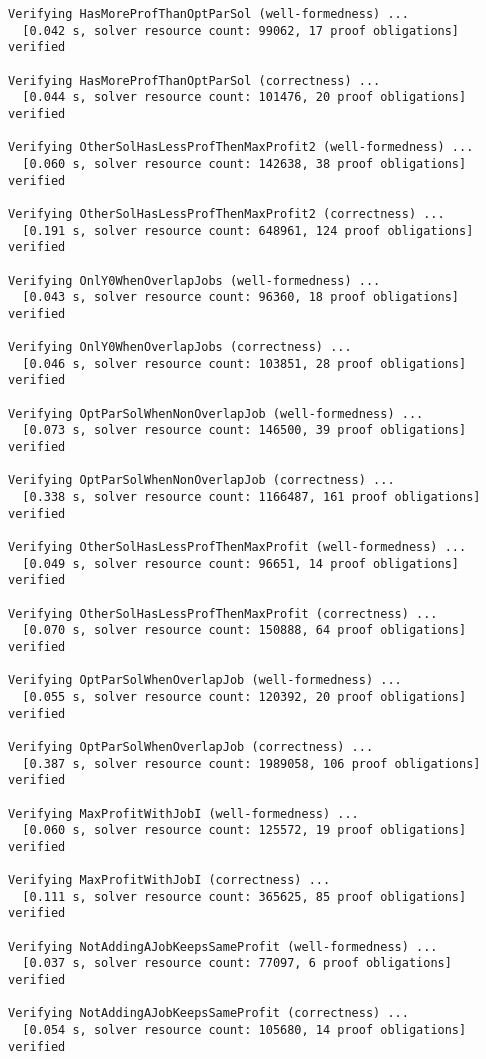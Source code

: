 \begin{Verbatim}[fontsize=\small]
Verifying HasMoreProfThanOptParSol (well-formedness) ...
  [0.042 s, solver resource count: 99062, 17 proof obligations]  verified

Verifying HasMoreProfThanOptParSol (correctness) ...
  [0.044 s, solver resource count: 101476, 20 proof obligations]  verified

Verifying OtherSolHasLessProfThenMaxProfit2 (well-formedness) ...
  [0.060 s, solver resource count: 142638, 38 proof obligations]  verified

Verifying OtherSolHasLessProfThenMaxProfit2 (correctness) ...
  [0.191 s, solver resource count: 648961, 124 proof obligations]  verified

Verifying OnlY0WhenOverlapJobs (well-formedness) ...
  [0.043 s, solver resource count: 96360, 18 proof obligations]  verified

Verifying OnlY0WhenOverlapJobs (correctness) ...
  [0.046 s, solver resource count: 103851, 28 proof obligations]  verified

Verifying OptParSolWhenNonOverlapJob (well-formedness) ...
  [0.073 s, solver resource count: 146500, 39 proof obligations]  verified

Verifying OptParSolWhenNonOverlapJob (correctness) ...
  [0.338 s, solver resource count: 1166487, 161 proof obligations]  verified

Verifying OtherSolHasLessProfThenMaxProfit (well-formedness) ...
  [0.049 s, solver resource count: 96651, 14 proof obligations]  verified

Verifying OtherSolHasLessProfThenMaxProfit (correctness) ...
  [0.070 s, solver resource count: 150888, 64 proof obligations]  verified

Verifying OptParSolWhenOverlapJob (well-formedness) ...
  [0.055 s, solver resource count: 120392, 20 proof obligations]  verified

Verifying OptParSolWhenOverlapJob (correctness) ...
  [0.387 s, solver resource count: 1989058, 106 proof obligations]  verified

Verifying MaxProfitWithJobI (well-formedness) ...
  [0.060 s, solver resource count: 125572, 19 proof obligations]  verified

Verifying MaxProfitWithJobI (correctness) ...
  [0.111 s, solver resource count: 365625, 85 proof obligations]  verified

Verifying NotAddingAJobKeepsSameProfit (well-formedness) ...
  [0.037 s, solver resource count: 77097, 6 proof obligations]  verified

Verifying NotAddingAJobKeepsSameProfit (correctness) ...
  [0.054 s, solver resource count: 105680, 14 proof obligations]  verified


\end{Verbatim}
